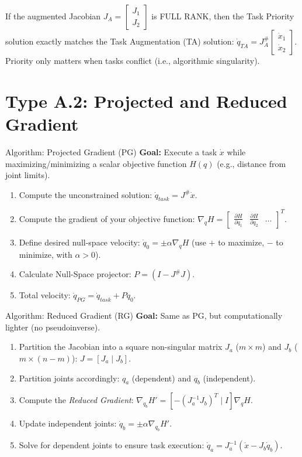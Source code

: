 \documentclass[11pt,a4paper]{article}
\begin{document}
\begin{examtip}
If the augmented Jacobian $J_A = \begin{bmatrix} J_1 \\ J_2 \end{bmatrix}$ is FULL RANK, then the Task Priority solution exactly matches the Task Augmentation (TA) solution: $\dot{q}_{TA} = J_A^\# \begin{bmatrix} \dot{x}_1 \\ \dot{x}_2 \end{bmatrix}$. Priority only matters when tasks conflict (i.e., algorithmic singularity).
\end{examtip}

\section{Type A.2: Projected and Reduced Gradient}

{Algorithm: Projected Gradient (PG)}
\textbf{Goal:} Execute a task $\dot{x}$ while maximizing/minimizing a scalar objective function $H(q)$ (e.g., distance from joint limits).
\begin{enumerate}
    \item Compute the unconstrained solution: $\dot{q}_{task} = J^\# \dot{x}$.
    \item Compute the gradient of your objective function: $\nabla_q H = \begin{bmatrix} \frac{\partial H}{\partial q_1} & \frac{\partial H}{\partial q_2} & \dots \end{bmatrix}^T$.
    \item Define desired null-space velocity: $\dot{q}_0 = \pm \alpha \nabla_q H$ (use $+$ to maximize, $-$ to minimize, with $\alpha > 0$).
    \item Calculate Null-Space projector: $P = (I - J^\# J)$.
    \item Total velocity: $\dot{q}_{PG} = \dot{q}_{task} + P \dot{q}_0$.
\end{enumerate}


{Algorithm: Reduced Gradient (RG)}
\textbf{Goal:} Same as PG, but computationally lighter (no pseudoinverse).
\begin{enumerate}
    \item Partition the Jacobian into a square non-singular matrix $J_a$ ($m \times m$) and $J_b$ ($m \times (n-m)$): $J = [J_a \mid J_b]$.
    \item Partition joints accordingly: $q_a$ (dependent) and $q_b$ (independent).
    \item Compute the \textit{Reduced Gradient}: $\nabla_{q_b} H' = [-(J_a^{-1} J_b)^T \mid I] \nabla_q H$.
    \item Update independent joints: $\dot{q}_b = \pm \alpha \nabla_{q_b} H'$.
    \item Solve for dependent joints to ensure task execution: $\dot{q}_a = J_a^{-1}(\dot{x} - J_b \dot{q}_b)$.
\end{enumerate}
\end{document}
